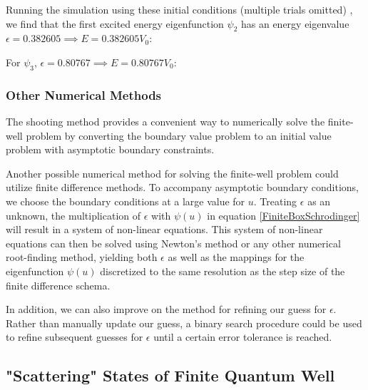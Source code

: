 \documentclass{article}
\begin{document}
Running the simulation using these initial conditions (multiple trials omitted)
, we find that the first excited energy eigenfunction $\psi_2$ has an energy
eigenvalue $\epsilon = 0.382605 \implies E = 0.382605V_0$:

\begin{figure}[H]
\centering
{}
\end{figure}

For $\psi_3$, $\epsilon = 0.80767 \implies E = 0.80767V_0$:

\begin{figure}[H]
\centering
{}
\end{figure}

\subsubsection{Other Numerical Methods} 
The shooting method provides a convenient way to numerically solve the
finite-well problem by converting the boundary value problem to an initial
value problem with asymptotic boundary constraints.

Another possible numerical method for solving the finite-well problem could
utilize finite difference methods. To accompany asymptotic boundary conditions, 
we choose the boundary conditions at a large value for $u$. Treating $\epsilon$
as an unknown, the multiplication of $\epsilon$ with $\psi(u)$ in equation
\eqref{FiniteBoxSchrodinger} will result in a system of non-linear equations.
This system of non-linear equations can then be solved using Newton's method or
any other numerical root-finding method, yielding both $\epsilon$ as well as
the mappings for the eigenfunction $\psi(u)$ discretized to the same resolution
as the step size of the finite difference schema.

In addition, we can also improve on the method for refining our guess for $\epsilon$. 
Rather than manually update our guess, a binary search procedure could be used to refine
subsequent guesses for $\epsilon$ until a certain error tolerance is reached.

\subsection{"Scattering" States of Finite Quantum Well}\label{sec:ScatterStates}
\end{document}
